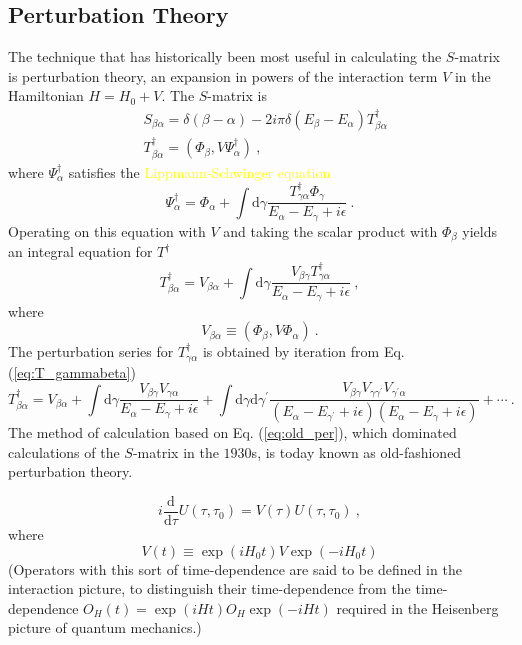 \documentclass[11pt,a4paper]{article}
\newcommand{\dif}{\mathrm{d}}
\begin{document}
\subsection{Perturbation Theory}
\cite{1995qtf..book.....W} The technique that has historically been most useful in calculating the $S$-matrix is perturbation theory, an expansion in powers of the interaction term $V$ in the Hamiltonian $H = H_0 +V$.  The $S$-matrix is
\begin{align}
\nonumber & S_{\beta \alpha} = \delta(\beta -\alpha) - 2i \pi \delta(E_\beta - E_\alpha) T_{\beta \alpha}^\dagger \\
\nonumber & T_{\beta \alpha}^\dagger = (\Phi_\beta, V \Psi_\alpha^\dagger) ~,
\end{align}
where $\Psi_\alpha^\dagger$ satisfies the \textcolor{yellow}{Lippmann-Schwinger equation}
\begin{equation}
\Psi_\alpha^\dagger = \Phi_\alpha +\int \dif \gamma \dfrac{T_{\gamma \alpha}^\dagger \Phi_\gamma}{E_\alpha -E_\gamma +i\epsilon} ~.
\end{equation}
Operating on this equation with $V$ and taking the scalar product with $\Phi_\beta$ yields an integral equation for $T^\dagger$
\begin{equation}
T_{\beta \alpha}^\dagger = V_{\beta \alpha} + \int \dif \gamma \dfrac{V_{\beta \gamma} T^\dagger_{\gamma \alpha}}{E_\alpha -E_\gamma +i\epsilon} ~,
\label{eq:T_gammabeta}
\end{equation}
where
\begin{equation}
V_{\beta \alpha} \equiv (\Phi_\beta, V \Phi_\alpha) ~.
\end{equation}
The perturbation series for $T_{\gamma \alpha}^\dagger$ is obtained by iteration from Eq. (\ref{eq:T_gammabeta})
\begin{equation}
T_{\beta \alpha}^\dagger = V_{\beta \alpha} +\int \dif \gamma \dfrac{V_{\beta \gamma} V_{\gamma \alpha}}{E_\alpha -E_\gamma +i\epsilon} +\int \dif \gamma \dif \gamma^\prime \dfrac{V_{\beta \gamma} V_{\gamma \gamma^\prime} V_{\gamma^\prime \alpha}}{(E_\alpha -E_{\gamma^\prime} +i\epsilon)(E_\alpha -E_\gamma +i\epsilon)} +\cdots ~.
\label{eq:old_per}
\end{equation}
The method of calculation based on Eq. (\ref{eq:old_per}), which dominated calculations of the $S$-matrix in the $1930$s, is today known as old-fashioned perturbation theory. 






\begin{equation}
i \dfrac{\dif }{\dif \tau} U(\tau, \tau_0) = V(\tau) U(\tau, \tau_0) ~,
\end{equation}
where
\begin{equation}
V(t) \equiv \exp(i H_0 t) V \exp(-i H_0 t)
\end{equation}
(Operators with this sort of time-dependence are said to be defined in the interaction picture, to distinguish their time-dependence from the time-dependence $O_H (t) = \exp(i H t) O_H \exp(-i H t)$ required in the Heisenberg picture of quantum mechanics.)
\end{document}
